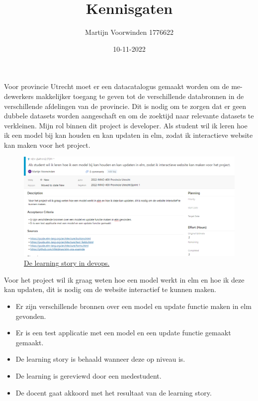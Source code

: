 \documentclass{article}
\title{Kennisgaten}
\author{Martijn Voorwinden 1776622}
\date{10-11-2022}
\newcommand{\ls}[8]{
    \maketitle
    \section*{Kennisgaten}
    \subsection*{Inleiding}
    #1
    \subsection*{Criteria}
    \begin{itemize}
        \item Kennis opdoen en kunnen toepassen binnen context.
    \end{itemize}
    \subsection*{Learning / Research Story}
    \textbf{#2}
    #3
    \subsubsection*{Acceptatiecriteria}
    #4
    \subsubsection*{Definition of Done (DoD)}
    #5
    \subsubsection*{Estimate}
    #6
    \subsubsection*{Artifacten / Realisatie}
    #7
    \subsubsection*{Bronnen}
    #8
}
\begin{document}
    \ls
    {
        Voor provincie Utrecht moet er een datacatalogus gemaakt worden om de me-
        dewerkers makkelijker toegang te geven tot de verschillende databronnen in de
        verschillende afdelingen van de provincie. Dit is nodig om te zorgen dat er geen
        dubbele datasets worden aangeschaft en om de zoektijd naar relevante datasets
        te verkleinen. Mijn rol binnen dit project is developer.
    }
    {
        Als student wil ik leren hoe ik een model bij kan houden en kan updaten in elm, 
        zodat ik interactieve website kan maken voor het project.
    }
    {
        \begin{figure}[H]
            \includegraphics[width=\textwidth,height=\textheight,keepaspectratio]{ls_02.png}
            \caption{\href{https://dev.azure.com/HU-HBO-ICT/2022-INNO-400-Provincie\%20Utrecht/_backlogs/backlog/2022-INNO-400-Provincie\%20Utrecht\%20Team/Epics/?workitem=96711}{De learning story in devops.}}
            \label{fig:ls_01}
        \end{figure}
        Voor het project wil ik graag weten hoe een model werkt in elm en hoe ik deze kan updaten,
        dit is nodig om de website interactief te kunnen maken.
    }
    {
        \begin{itemize}
            \item Er zijn verschillende bronnen over een model en update functie maken in elm gevonden.
            \item Er is een test applicatie met een model en een update functie gemaakt gemaakt.
        \end{itemize}
    }
    {
        \begin{itemize}
            \item De learning story is behaald wanneer deze op niveau is.
            \item De learning is gereviewd door een medestudent.
            \item De docent gaat akkoord met het resultaat van de learning story.
        \end{itemize}
    }
\end{document}
